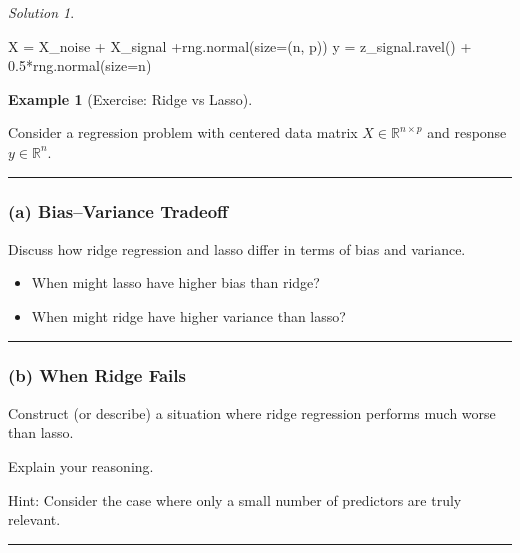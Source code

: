 \documentclass[
  english,
]{article}
\newenvironment{Shaded}{\begin{snugshade}}{\end{snugshade}}
\newcommand{\FloatTok}[1]{\textcolor[rgb]{0.68,0.00,0.00}{#1}}
\newcommand{\NormalTok}[1]{\textcolor[rgb]{0.00,0.23,0.31}{#1}}
\newcommand{\OperatorTok}[1]{\textcolor[rgb]{0.37,0.37,0.37}{#1}}
\providecommand{\tightlist}{%
  \setlength{\itemsep}{0pt}\setlength{\parskip}{0pt}}
\theoremstyle{definition}
\newtheorem{example}{Example}[section]
\theoremstyle{definition}
\theoremstyle{remark}
\newtheorem*{solution}{Solution}
\begin{document}
\begin{solution}
\begin{Shaded}
\begin{Highlighting}[]
\NormalTok{X }\OperatorTok{=}\NormalTok{ X\_noise }\OperatorTok{+}\NormalTok{ X\_signal }\OperatorTok{+}\NormalTok{rng.normal(size}\OperatorTok{=}\NormalTok{(n, p))}
\NormalTok{y }\OperatorTok{=}\NormalTok{ z\_signal.ravel() }\OperatorTok{+} \FloatTok{0.5}\OperatorTok{*}\NormalTok{rng.normal(size}\OperatorTok{=}\NormalTok{n)}
\end{Highlighting}
\end{Shaded}

\end{solution}

\begin{example}[Exercise: Ridge vs
Lasso]\protect\hypertarget{exm-}{}\label{exm-}

Consider a regression problem with centered data matrix
\(X \in \mathbb{R}^{n \times p}\) and response \(y \in \mathbb{R}^n\).

\begin{center}\rule{0.5\linewidth}{0.5pt}\end{center}

\subsubsection{(a) Bias--Variance
Tradeoff}\label{a-biasvariance-tradeoff}

Discuss how ridge regression and lasso differ in terms of bias and
variance.

\begin{itemize}
\tightlist
\item
  When might lasso have higher bias than ridge?
\item
  When might ridge have higher variance than lasso?
\end{itemize}

\begin{center}\rule{0.5\linewidth}{0.5pt}\end{center}

\subsubsection{(b) When Ridge Fails}\label{b-when-ridge-fails}

Construct (or describe) a situation where ridge regression performs much
worse than lasso.

Explain your reasoning.

Hint: Consider the case where only a small number of predictors are
truly relevant.

\begin{center}\rule{0.5\linewidth}{0.5pt}\end{center}


\end{example}
\end{document}
